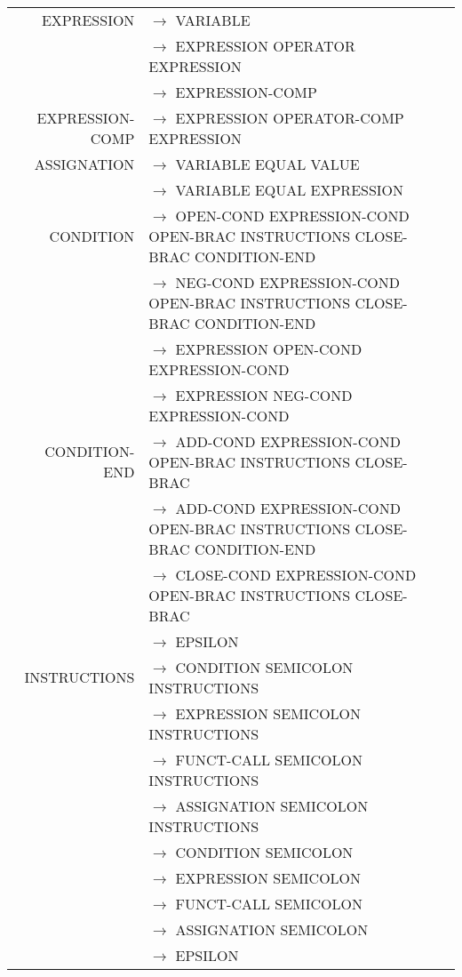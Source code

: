 \documentclass[a4paper,10pt]{article}
\begin{document}
~\\

\hspace{-4.5cm}\begin{tabular}{rl}
\hline
EXPRESSION			& $\rightarrow$ VARIABLE   \\
					& $\rightarrow$ EXPRESSION OPERATOR EXPRESSION \\ 
					& $\rightarrow$ EXPRESSION-COMP \\
EXPRESSION-COMP		& $\rightarrow$ EXPRESSION OPERATOR-COMP EXPRESSION \\
ASSIGNATION			& $\rightarrow$ VARIABLE EQUAL VALUE \\
					& $\rightarrow$ VARIABLE EQUAL EXPRESSION \\
					
CONDITION			& $\rightarrow$ OPEN-COND EXPRESSION-COND OPEN-BRAC INSTRUCTIONS CLOSE-BRAC CONDITION-END\\
					& $\rightarrow$ NEG-COND EXPRESSION-COND OPEN-BRAC INSTRUCTIONS CLOSE-BRAC CONDITION-END\\
					& $\rightarrow$ EXPRESSION OPEN-COND EXPRESSION-COND \\
					& $\rightarrow$ EXPRESSION NEG-COND EXPRESSION-COND \\


CONDITION-END		& $\rightarrow$ ADD-COND EXPRESSION-COND OPEN-BRAC INSTRUCTIONS CLOSE-BRAC \\
					& $\rightarrow$ ADD-COND EXPRESSION-COND OPEN-BRAC INSTRUCTIONS CLOSE-BRAC CONDITION-END \\
					& $\rightarrow$ CLOSE-COND EXPRESSION-COND OPEN-BRAC INSTRUCTIONS CLOSE-BRAC\\
					& $\rightarrow$ EPSILON \\
					
					
					
					
					
INSTRUCTIONS		& $\rightarrow$ CONDITION SEMICOLON INSTRUCTIONS\\
					& $\rightarrow$ EXPRESSION SEMICOLON INSTRUCTIONS\\
					& $\rightarrow$ FUNCT-CALL SEMICOLON INSTRUCTIONS\\
					& $\rightarrow$ ASSIGNATION SEMICOLON INSTRUCTIONS\\
					& $\rightarrow$ CONDITION SEMICOLON \\
					& $\rightarrow$ EXPRESSION SEMICOLON \\
					& $\rightarrow$ FUNCT-CALL SEMICOLON \\
					& $\rightarrow$ ASSIGNATION SEMICOLON \\
					& $\rightarrow$ EPSILON \\
					

\end{tabular}
\end{document}
